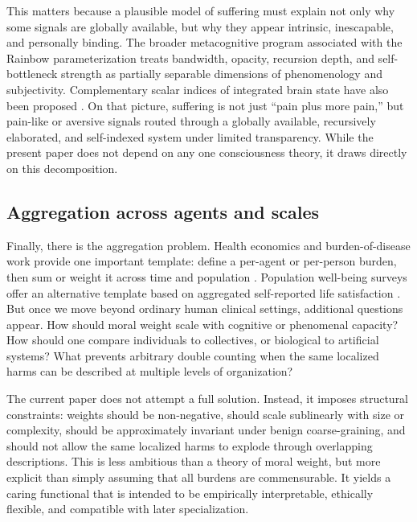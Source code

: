 \documentclass[11pt]{article}
\begin{document}
This matters because a plausible model of suffering must explain not only why some signals are globally available, but why they appear intrinsic, inescapable, and personally binding. The broader metacognitive program associated with the Rainbow parameterization \cite{zarncke2026rainbow} treats bandwidth, opacity, recursion depth, and self-bottleneck strength as partially separable dimensions of phenomenology and subjectivity. Complementary scalar indices of integrated brain state have also been proposed \cite{casali2013pci}. On that picture, suffering is not just “pain plus more pain,” but pain-like or aversive signals routed through a globally available, recursively elaborated, and self-indexed system under limited transparency. While the present paper does not depend on any one consciousness theory, it draws directly on this decomposition.

\subsection{Aggregation across agents and scales}

Finally, there is the aggregation problem. Health economics and burden-of-disease work provide one important template: define a per-agent or per-person burden, then sum or weight it across time and population \cite{whitehead2010qaly,murray1996globalburden,murray2013gbd}. Population well-being surveys offer an alternative template based on aggregated self-reported life satisfaction \cite{helliwell2024whr}. But once we move beyond ordinary human clinical settings, additional questions appear. How should moral weight scale with cognitive or phenomenal capacity? How should one compare individuals to collectives, or biological to artificial systems? What prevents arbitrary double counting when the same localized harms can be described at multiple levels of organization?

The current paper does not attempt a full solution. Instead, it imposes structural constraints: weights should be non-negative, should scale sublinearly with size or complexity, should be approximately invariant under benign coarse-graining, and should not allow the same localized harms to explode through overlapping descriptions. This is less ambitious than a theory of moral weight, but more explicit than simply assuming that all burdens are commensurable. It yields a caring functional that is intended to be empirically interpretable, ethically flexible, and compatible with later specialization.
\end{document}
